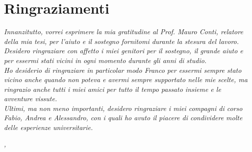 \cleardoublepage
{}
\thispagestyle{empty}


\begingroup
\let\clearpage\relax
\let\cleardoublepage\relax
\let\cleardoublepage\relax

\section*{Ringraziamenti}

\noindent \textit{Innanzitutto, vorrei esprimere la mia gratitudine al Prof.
Mauro Conti, relatore della mia tesi, per l'aiuto e il sostegno fornitomi
durante la stesura del lavoro.}\\

\noindent \textit{Desidero ringraziare con affetto i miei genitori per il
sostegno, il grande aiuto e per essermi stati vicini in ogni momento durante
gli anni di studio.}\\

\noindent \textit{Ho desiderio di ringraziare in particolar modo Franco per
essermi sempre stato vicino anche quando non poteva e avermi sempre supportato
nelle mie scelte, ma ringrazio anche tutti i miei amici per tutto il tempo
passato insieme e le avventure vissute.}\\

\noindent \textit{Ultimi, ma non meno importanti, desidero ringraziare i miei
compagni di corso Fabio, Andrea e Alessandro, con i quali ho avuto il
piacere di condividere molte delle esperienze universitarie.}\\
\bigskip

\noindent\textit{\myLocation, \myTime}
\hfill \myName

\endgroup
